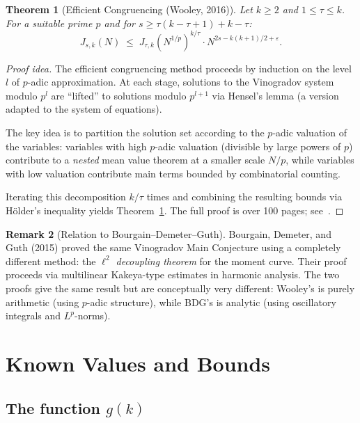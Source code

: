 \documentclass[12pt,a4paper]{amsart}
\newtheorem{theorem}{Theorem}[section]
\theoremstyle{definition}
\newtheorem{remark}[theorem]{Remark}
\begin{document}
\begin{theorem}[Efficient Congruencing (Wooley, 2016)]\label{thm:effcong}
  Let $k \geq 2$ and $1 \leq \tau \leq k$.  For a suitable prime $p$
  and for $s \geq \tau(k - \tau + 1) + k - \tau$:
  \[
    J_{s,k}(N) \;\leq\; J_{\tau,k}(N^{1/p})^{k/\tau}
                         \cdot N^{2s - k(k+1)/2 + \varepsilon}.
  \]
\end{theorem}

\begin{proof}[Proof idea]
  The efficient congruencing method proceeds by induction on the level $l$
  of $p$-adic approximation.  At each stage, solutions to the Vinogradov
  system modulo $p^l$ are ``lifted'' to solutions modulo $p^{l+1}$ via
  Hensel's lemma (a version adapted to the system of equations).

  The key idea is to partition the solution set according to the $p$-adic
  valuation of the variables: variables with high $p$-adic valuation
  (divisible by large powers of $p$) contribute to a \emph{nested}
  mean value theorem at a smaller scale $N/p$, while variables with
  low valuation contribute main terms bounded by combinatorial counting.

  Iterating this decomposition $k/\tau$ times and combining the resulting
  bounds via H\"older's inequality yields Theorem~\ref{thm:effcong}.  The
  full proof is over 100 pages; see~\cite{Wooley2016}.
\end{proof}

\begin{remark}[Relation to Bourgain--Demeter--Guth]
  Bourgain, Demeter, and Guth (2015) proved the same Vinogradov Main
  Conjecture using a completely different method: the \emph{$\ell^2$ decoupling
  theorem} for the moment curve.  Their proof proceeds via multilinear
  Kakeya-type estimates in harmonic analysis.  The two proofs give the
  same result but are conceptually very different: Wooley's is purely
  arithmetic (using $p$-adic structure), while BDG's is analytic
  (using oscillatory integrals and $L^p$-norms).
\end{remark}

\section{Known Values and Bounds}
\label{sec:table}

\subsection{The function $g(k)$}
\end{document}

